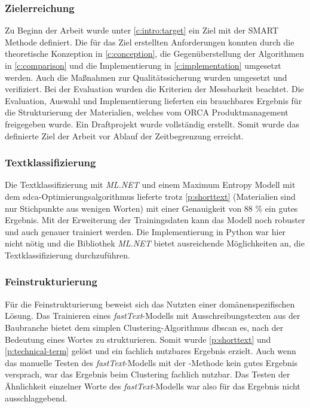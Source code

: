\subsubsection{Zielerreichung}
Zu Beginn der Arbeit wurde unter \autoref{c:intro:target} ein Ziel mit der SMART Methode definiert. Die für das Ziel erstellten Anforderungen konnten durch die theoretische Konzeption in \autoref{c:conception}, die Gegenüberstellung der Algorithmen in \autoref{c:comparison} und die Implementierung in \autoref{c:implementation} umgesetzt werden. Auch die Maßnahmen zur Qualitätssicherung wurden umgesetzt und verifiziert. Bei der Evaluation wurden die Kriterien der Messbarkeit beachtet. Die Evaluation, Auswahl und Implementierung lieferten ein brauchbares Ergebnis für die Strukturierung der Materialien, welches vom ORCA Produktmanagement freigegeben wurde. Ein Draftprojekt wurde vollständig erstellt. Somit wurde das definierte Ziel der Arbeit vor Ablauf der Zeitbegrenzung erreicht.

\subsubsection{Textklassifizierung}
Die Textklassifizierung mit \textit{ML.NET} und einem Maximum Entropy Modell mit dem \ac{sdca}-Optimierungsalgorithmus lieferte trotz \autoref{p:shorttext} (Materialien sind nur Stichpunkte aus wenigen Worten) mit einer Genauigkeit von 88 \% ein gutes Ergebnis. Mit der Erweiterung der Trainingsdaten kann das Modell noch robuster und auch genauer trainiert werden. Die Implementierung in Python war hier nicht nötig und die Bibliothek \textit{ML.NET} bietet ausreichende Möglichkeiten an, die Textklassifizierung durchzuführen.

\subsubsection{Feinstrukturierung}
Für die Feinstrukturierung beweist sich das Nutzten einer domänenspezifischen Lösung. Das Trainieren eines \textit{fastText}-Modells mit Ausschreibungstexten aus der Baubranche bietet dem simplen Clustering-Algorithmus \ac{dbscan} es, nach der Bedeutung eines Wortes zu strukturieren. Somit wurde \autoref{p:shorttext} und \autoref{p:technical-term} gelöst und ein fachlich nutzbares Ergebnis erzielt. Auch wenn das manuelle Testen des \textit{fastText}-Modells mit der -Methode kein gutes Ergebnis versprach, war das Ergebnis beim Clustering fachlich nutzbar. Das Testen der Ähnlichkeit einzelner Worte des \textit{fastText}-Modells war also für das Ergebnis nicht ausschlaggebend.

